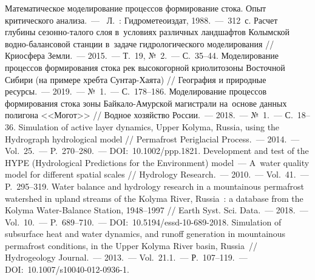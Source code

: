 \begin{thebibliography}{99}
\bibitem{} Математическое моделирование процессов формирование стока. Опыт критического анализа.~---  Л.~: Гидрометеоиздат, 1988.~--- 312~с.
\bibitem{} Расчет глубины сезонно-талого слоя в~условиях различных ландшафтов Колымской водно-балансовой станции в~задаче гидрологического моделирования // Криосфера Земли.~--- 2015.~--- Т.~19, №~2.~--- С.~35--44.
\bibitem{} Моделирование процессов формирования стока рек высокогорной криолитозоны Восточной Сибири (на примере хребта Сунтар-Хаята) // География и природные ресурсы.~--- 2019.~--- №~1.~--- С.~178--186.
\bibitem{} Моделирование процессов формирования стока зоны Байкало-Амурской магистрали на~основе данных полигона <<Могот>> // Водное хозяйство России.~--- 2018.~--- №~1.~--- С.~18--36.
\bibitem{} Simulation of active layer dynamics, Upper Kolyma, Russia, using the Hydrograph hydrological model // Permafrost Periglacial Process.~--- 2014.~--- Vol.~25.~--- P.~270--280.~--- DOI:~10.1002/ppp.1821.
\bibitem{} Development and test of the HYPE (Hydrological Predictions for the Environment) model~--- A~water quality model for different spatial scales // Hydrology Research.~--- 2010.~--- Vol.~41.~--- P.~295--319.
\bibitem{} Water balance and hydrology research in a mountainous permafrost watershed in upland streams of the Kolyma River, Russia~: a database from the Kolyma Water-Balance Station, 1948--1997 // Earth Syst. Sci. Data.~--- 2018.~--- Vol.~10.~--- P.~689--710.~--- DOI:~10.5194/essd-10-689-2018.
\bibitem{} Simulation of subsurface heat and water dynamics, and runoff generation in mountainous permafrost conditions, in the Upper Kolyma River basin, Russia~// Hydrogeology Journal.~--- 2013.~--- Vol.~21.1.~--- Р.~107--119.~--- DOI:~10.1007/s10040-012-0936-1.

\end{thebibliography}
